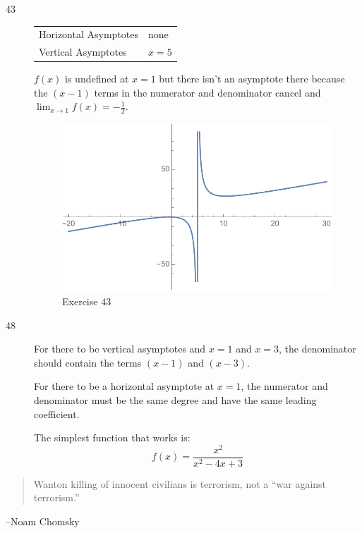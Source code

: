 \documentclass[letterpaper, landscape]{exam}
\begin{document}
\begin{description}
      \item[43]
        \begin{tabular}[H]{ll}
          \toprule
          Horizontal Asymptotes & none \\
          Vertical Asymptotes   & $x = 5$ \\
          \bottomrule
        \end{tabular}

        $f(x)$ is undefined at $x = 1$ but there isn't an asymptote there because the
        $(x - 1)$ terms in the numerator and denominator cancel and 
        $\lim_{x \to 1} f(x) = -\frac{1}{2}$.

        \begin{figure}[H]
          \centering
          \includegraphics[scale = 0.5]{ex43.pdf}
          \caption{Exercise 43}
          \label{fig:ex43}
        \end{figure}

      \item[48] For there to be vertical asymptotes and $x = 1$ and $x = 3$, the
        denominator should contain the terms $(x - 1)$ and $(x - 3)$.

        For there to be a horizontal asymptote at $x = 1$, the numerator and denominator
        must be the same degree and have the same leading coefficient.

        The simplest function that works is:
        \[
          \boxed{ f(x) = \frac{x^2}{x^2 - 4x + 3} }
        \]
    \end{description}

  \else
    \vspace{10 cm}
    \begin{quote}
      \begin{em}
        Wanton killing of innocent civilians is terrorism, not a ``war against
        terrorism.'' 
      \end{em}
    \end{quote}
    \hspace{1 cm} --Noam Chomsky
  \fi
\end{document}

